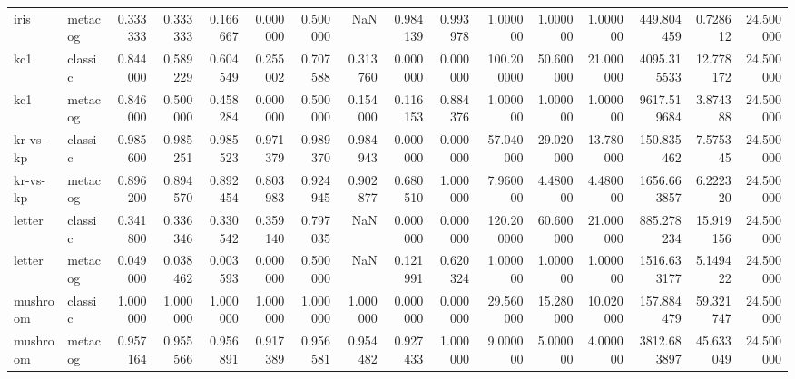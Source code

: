 \begin{tabular}{llrrrrrrrrrrrrrr}
iris & metacog & 0.333333 & 0.333333 & 0.166667 & 0.000000 & 0.500000 & NaN & 0.984139 & 0.993978 & 1.000000 & 1.000000 & 1.000000 & 449.804459 & 0.728612 & 24.500000 \\
kc1 & classic & 0.844000 & 0.589229 & 0.604549 & 0.255002 & 0.707588 & 0.313760 & 0.000000 & 0.000000 & 100.200000 & 50.600000 & 21.000000 & 4095.315533 & 12.778172 & 24.500000 \\
kc1 & metacog & 0.846000 & 0.500000 & 0.458284 & 0.000000 & 0.500000 & 0.154000 & 0.116153 & 0.884376 & 1.000000 & 1.000000 & 1.000000 & 9617.519684 & 3.874388 & 24.500000 \\
kr-vs-kp & classic & 0.985600 & 0.985251 & 0.985523 & 0.971379 & 0.989370 & 0.984943 & 0.000000 & 0.000000 & 57.040000 & 29.020000 & 13.780000 & 150.835462 & 7.575345 & 24.500000 \\
kr-vs-kp & metacog & 0.896200 & 0.894570 & 0.892454 & 0.803983 & 0.924945 & 0.902877 & 0.680510 & 1.000000 & 7.960000 & 4.480000 & 4.480000 & 1656.663857 & 6.222320 & 24.500000 \\
letter & classic & 0.341800 & 0.336346 & 0.330542 & 0.359140 & 0.797035 & NaN & 0.000000 & 0.000000 & 120.200000 & 60.600000 & 21.000000 & 885.278234 & 15.919156 & 24.500000 \\
letter & metacog & 0.049000 & 0.038462 & 0.003593 & 0.000000 & 0.500000 & NaN & 0.121991 & 0.620324 & 1.000000 & 1.000000 & 1.000000 & 1516.633177 & 5.149422 & 24.500000 \\
mushroom & classic & 1.000000 & 1.000000 & 1.000000 & 1.000000 & 1.000000 & 1.000000 & 0.000000 & 0.000000 & 29.560000 & 15.280000 & 10.020000 & 157.884479 & 59.321747 & 24.500000 \\
mushroom & metacog & 0.957164 & 0.955566 & 0.956891 & 0.917389 & 0.956581 & 0.954482 & 0.927433 & 1.000000 & 9.000000 & 5.000000 & 4.000000 & 3812.683897 & 45.633049 & 24.500000 \\
\bottomrule
\end{tabular}
